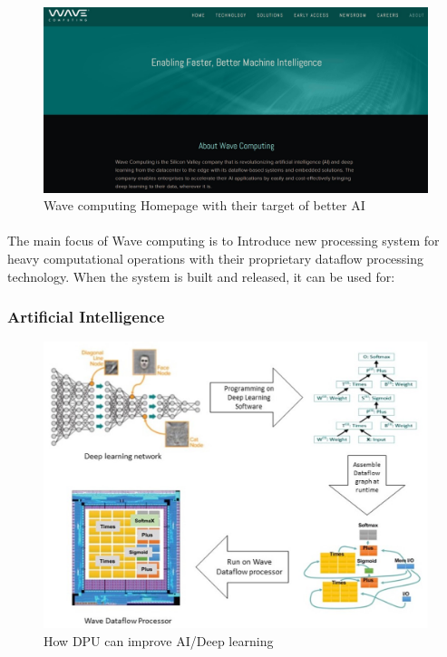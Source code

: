 \begin{figure}[H]
    \centering
    \includegraphics[trim=0cm 0cm 0cm 0cm, clip=true,scale=0.25]{figures/wave_site.jpg}
    \caption{Wave computing Homepage with their target of better AI\label{Fig:wavesite}}\vspace{-4mm}
    \end{figure}

\paragraph{}
The main focus of Wave computing is to Introduce new processing system for heavy computational operations with their proprietary dataflow processing technology. When the system is built and released, it can be used for:

\subsubsection*{Artificial Intelligence}

\begin{figure}[H]
    \centering
    \includegraphics[trim=0cm 0cm 0cm 0cm, clip=true,scale=0.25]{figures/dl_net.jpg}
    \caption{How DPU can improve AI/Deep learning\label{Fig:dlnet}}\vspace{-4mm}
    \end{figure}

